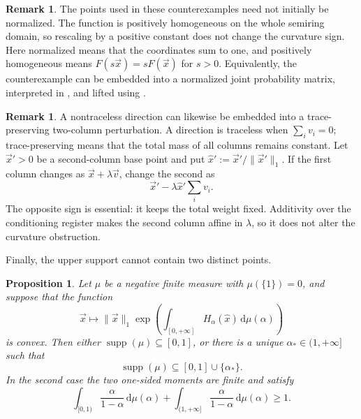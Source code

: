 \documentclass[aps,pra,11pt,onecolumn,nofootinbib,tightenlines]{revtex4-2}
\newtheorem{proposition}[theorem]{Proposition}
\theoremstyle{definition}
\newtheorem{remark}[theorem]{Remark}
\def \d {\mathrm{d}}
\begin{document}
\begin{remark}
\label{rem:normalizing-witnesses}
The points used in these counterexamples need not initially be normalized.  The
function is positively homogeneous on the whole semiring domain, so rescaling by
a positive constant does not change the curvature sign.  Here normalized means
that the coordinates sum to one, and positively homogeneous means
$F(s\vec{x})=sF(\vec{x})$ for $s>0$.  Equivalently, the
counterexample can be embedded into a normalized joint probability matrix,
interpreted in \ParameterMainSemiring, and lifted using \ParameterMainLift.
\end{remark}

\begin{remark}
\label{rem:trace-preserving-witnesses}
A nontraceless direction can likewise be embedded into a trace-preserving
two-column perturbation.  A direction is traceless when $\sum_i v_i=0$;
trace-preserving means that the total mass of all columns remains constant.
Let $\vec{x}'>0$ be a second-column base point and put
$\hat{x}':=\vec{x}'/\|\vec{x}'\|_1$.  If the first column changes as
$\vec{x}+\lambda\vec{v}$, change the second as
\begin{equation}
\vec{x}'-\lambda\hat{x}'\sum_i v_i.
\end{equation}
The opposite sign is essential: it keeps the total weight fixed.  Additivity over
the conditioning register makes the second column affine in $\lambda$, so it
does not alter the curvature obstruction.
\end{remark}

Finally, the upper support cannot contain two distinct points.

\begin{proposition}
\label{prop:third-measure}
Let $\mu$ be a negative finite measure with $\mu(\{1\})=0$, and suppose that the
function
\begin{equation}
\vec{x}\longmapsto\|\vec{x}\|_1
\exp\!\left(\int_{[0,+\infty]}H_\alpha(\hat{x})\,
\d\mu(\alpha)\right)
\end{equation}
is convex.  Then either $\operatorname{supp}(\mu)\subseteq[0,1]$, or there is a
unique $\alpha_*\in(1,+\infty]$ such that
\begin{equation}
\operatorname{supp}(\mu)\subseteq[0,1]\cup\{\alpha_*\}.
\end{equation}
In the second case the two one-sided moments are finite and satisfy
\begin{equation}
\label{eq:negative-moment-necessary}
\int_{[0,1)}\frac{\alpha}{1-\alpha}\,\d\mu(\alpha)
+\int_{(1,+\infty]}\frac{\alpha}{1-\alpha}\,\d\mu(\alpha)\geq1.
\end{equation}
\end{proposition}
\end{document}
